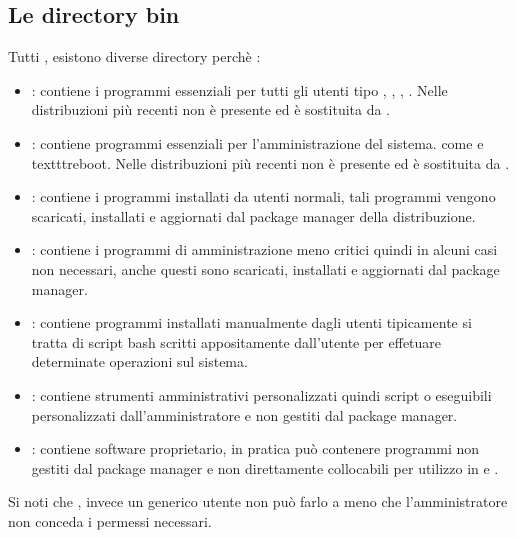 \subsection{Le directory bin}
\label{subsec:Le-directory-bin}
Tutti , esistono diverse directory  perchè :
\begin{itemize}
    \item {}: contiene i programmi essenziali per tutti gli utenti tipo , , , . Nelle distribuzioni più recenti non è presente ed è sostituita da .
    \item {}: contiene programmi essenziali per l'amministrazione del sistema.  come  e texttt{reboot}. Nelle distribuzioni più recenti non è presente ed è sostituita da .
    \item {}: contiene i programmi installati da utenti normali, tali programmi vengono scaricati, installati e aggiornati dal package manager della distribuzione. 
    \item {}: contiene i programmi di amministrazione meno critici quindi in alcuni casi non necessari, anche questi sono scaricati, installati e aggiornati dal package manager. 
    \item {}: contiene programmi installati manualmente dagli utenti tipicamente si tratta di script bash scritti appositamente dall'utente per effetuare determinate operazioni sul sistema.
    \item {}: contiene strumenti amministrativi personalizzati quindi script o eseguibili personalizzati dall'amministratore e non gestiti dal package manager.
    \item {}: contiene software proprietario, in pratica può contenere programmi non gestiti dal package manager e non direttamente collocabili per utilizzo in  e .
\end{itemize} 
Si noti che , invece un generico utente non può farlo a meno che l'amministratore non conceda i permessi necessari.

